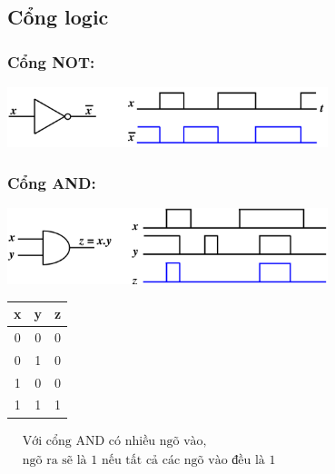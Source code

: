 \subsection{Cổng logic}
\subsubsection{Cổng NOT:}
\begin{center}
    \includegraphics[width = 0.7\textwidth]{./local/image/20.png}
\end{center}
\subsubsection{Cổng AND:}
\begin{center}
    \includegraphics[width = 0.7\textwidth]{./local/image/21.png}
\end{center}
\begin{table}[h!]
    \centering
    \begin{tabular}{|cc|c|}
    \hline
    \textbf{x} & \textbf{y} & \textbf{z} \\ \hline
    0          & 0          & 0                      \\
    0          & 1          & 0                      \\
    1          & 0          & 0                      \\
    1          & 1          & 1                      \\ \hline
    \end{tabular} \qquad
    $\begin{aligned}
        &\text{Với cổng AND có nhiều ngõ vào,}\\
        &\text{ngõ ra sẽ là 1 nếu tất cả các ngõ vào đều là 1}
    \end{aligned}$
\end{table}
